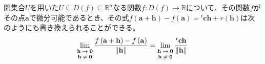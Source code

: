 \documentclass[dvipdfmx]{jsarticle}
\begin{document}
\begin{thm}\label{4.2.5.2}
開集合$U$を用いた$U \subseteq D(f) \subseteq \mathbb{R}^{n}$なる関数$f:D(f) \rightarrow \mathbb{R}$について、その関数$f$がその点$\mathbf{a}$で微分可能であるとき、その式$f\left( \mathbf{a} + \mathbf{h} \right) - f\left( \mathbf{a} \right) ={}^{t}\mathbf{ch} + r\left( \mathbf{h} \right)$は次のようにも書き換えられることができる。
\begin{align*}
\lim_{\scriptsize \begin{matrix}
\mathbf{h} \rightarrow \mathbf{0} \\
\mathbf{h} \neq \mathbf{0} \\
\end{matrix}}\frac{f\left( \mathbf{a} + \mathbf{h} \right) - f\left( \mathbf{a} \right)}{\left\| \mathbf{h} \right\|} = \lim_{\scriptsize \begin{matrix}
\mathbf{h} \rightarrow \mathbf{0} \\
\mathbf{h} \neq \mathbf{0} \\
\end{matrix}}\frac{{}^{t}\mathbf{ch}}{\left\| \mathbf{h} \right\|}
\end{align*}
\end{thm}
\end{document}
